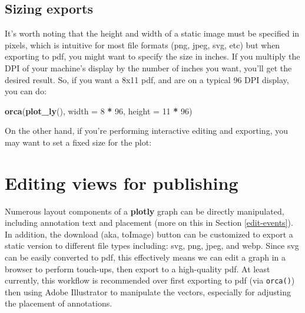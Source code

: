 \documentclass[
  12pt,
]{krantz}
\newenvironment{Shaded}{\begin{snugshade}}{\end{snugshade}}
\newcommand{\DataTypeTok}[1]{\textcolor[rgb]{0.13,0.29,0.53}{#1}}
\newcommand{\DecValTok}[1]{\textcolor[rgb]{0.00,0.00,0.81}{#1}}
\newcommand{\KeywordTok}[1]{\textcolor[rgb]{0.13,0.29,0.53}{\textbf{#1}}}
\newcommand{\NormalTok}[1]{#1}
\newcommand{\OperatorTok}[1]{\textcolor[rgb]{0.81,0.36,0.00}{\textbf{#1}}}
\newcommand{\StringTok}[1]{\textcolor[rgb]{0.31,0.60,0.02}{#1}}
\begin{document}
\hypertarget{sizing-exports}{%
\section{Sizing exports}\label{sizing-exports}}

It's worth noting that the height and width of a static image must be specified in pixels, which is intuitive for most file formats (png, jpeg, svg, etc) but when exporting to pdf, you might want to specify the size in inches. If you multiply the DPI of your machine's display by the number of inches you want, you'll get the desired result. So, if you want a 8x11 pdf, and are on a typical 96 DPI display, you can do:

\begin{Shaded}
\begin{Highlighting}[]
\KeywordTok{orca}\NormalTok{(}\KeywordTok{plot_ly}\NormalTok{(), }\DataTypeTok{width =} \DecValTok{8} \OperatorTok{*}\StringTok{ }\DecValTok{96}\NormalTok{, }\DataTypeTok{height =} \DecValTok{11} \OperatorTok{*}\StringTok{ }\DecValTok{96}\NormalTok{)}
\end{Highlighting}
\end{Shaded}

On the other hand, if you're performing interactive editing and exporting, you may want to set a fixed size for the plot:

\begin{Shaded}
\end{Shaded}

\hypertarget{editing-views}{%
\chapter{Editing views for publishing}\label{editing-views}}


Numerous layout components of a \textbf{plotly} graph can be directly manipulated, including annotation text and placement (more on this in Section \ref{edit-events}). In addition, the download (aka, toImage) button can be customized to export a static version to different file types including: svg, png, jpeg, and webp. Since svg can be easily converted to pdf, this effectively means we can edit a graph in a browser to perform touch-ups, then export to a high-quality pdf. At least currently, this workflow is recommended over first exporting to pdf (via \texttt{orca()}) then using Adobe Illustrator to manipulate the vectors, especially for adjusting the placement of annotations.
\end{document}
